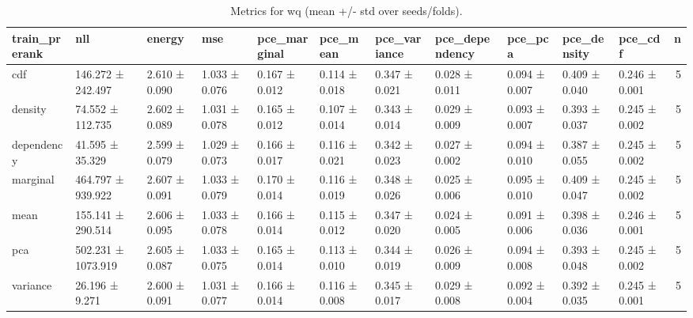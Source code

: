 \begin{table}
\caption{Metrics for wq (mean +/- std over seeds/folds).}
\label{tab:metrics_summary_wq}
\begin{tabular}{lllllllllllr}
\toprule
train_prerank & nll & energy & mse & pce_marginal & pce_mean & pce_variance & pce_dependency & pce_pca & pce_density & pce_cdf & n \\
\midrule
cdf & 146.272 ± 242.497 & 2.610 ± 0.090 & 1.033 ± 0.076 & 0.167 ± 0.012 & 0.114 ± 0.018 & 0.347 ± 0.021 & 0.028 ± 0.011 & 0.094 ± 0.007 & 0.409 ± 0.040 & 0.246 ± 0.001 & 5 \\
density & 74.552 ± 112.735 & 2.602 ± 0.089 & 1.031 ± 0.078 & 0.165 ± 0.012 & 0.107 ± 0.014 & 0.343 ± 0.014 & 0.029 ± 0.009 & 0.093 ± 0.007 & 0.393 ± 0.037 & 0.245 ± 0.002 & 5 \\
dependency & 41.595 ± 35.329 & 2.599 ± 0.079 & 1.029 ± 0.073 & 0.166 ± 0.017 & 0.116 ± 0.021 & 0.342 ± 0.023 & 0.027 ± 0.002 & 0.094 ± 0.010 & 0.387 ± 0.055 & 0.245 ± 0.002 & 5 \\
marginal & 464.797 ± 939.922 & 2.607 ± 0.091 & 1.033 ± 0.079 & 0.170 ± 0.014 & 0.116 ± 0.019 & 0.348 ± 0.026 & 0.025 ± 0.006 & 0.095 ± 0.010 & 0.409 ± 0.047 & 0.245 ± 0.002 & 5 \\
mean & 155.141 ± 290.514 & 2.606 ± 0.095 & 1.033 ± 0.078 & 0.166 ± 0.014 & 0.115 ± 0.012 & 0.347 ± 0.020 & 0.024 ± 0.005 & 0.091 ± 0.006 & 0.398 ± 0.036 & 0.246 ± 0.001 & 5 \\
pca & 502.231 ± 1073.919 & 2.605 ± 0.087 & 1.033 ± 0.075 & 0.165 ± 0.014 & 0.113 ± 0.010 & 0.344 ± 0.019 & 0.026 ± 0.009 & 0.094 ± 0.008 & 0.393 ± 0.048 & 0.245 ± 0.002 & 5 \\
variance & 26.196 ± 9.271 & 2.600 ± 0.091 & 1.031 ± 0.077 & 0.166 ± 0.014 & 0.116 ± 0.008 & 0.345 ± 0.017 & 0.029 ± 0.008 & 0.092 ± 0.004 & 0.392 ± 0.035 & 0.245 ± 0.001 & 5 \\
\bottomrule
\end{tabular}
\end{table}
